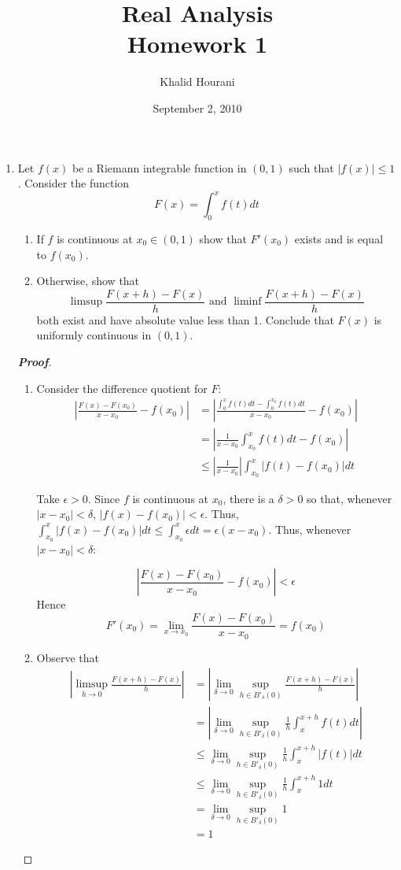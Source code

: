 \documentclass[12pt,leqno]{book}
\title{Real Analysis\\\large Homework 1}
\date{September 2, 2010}
\author{Khalid Hourani}
\theoremstyle{definition}
\newenvironment{Proof}{\begin{proof}[\textnormal{\textbf{Proof}}]}{\end{proof}}
\begin{document}
\begin{titlepage}
 \maketitle
\end{titlepage}

\begin{enumerate}
 \item Let $f(x)$ be a Riemann integrable function in $(0,1)$ such that $|f(x)|\leq1$. Consider the function \[F(x)=\int_0^xf(t)dt\]  \begin{enumerate}                                                                                                                                           \item If $f$ is continuous at $x_0\in(0,1)$ show that $F'(x_0)$ exists and is equal to $f(x_0)$.
 \item Otherwise, show that \[\limsup{\frac{F(x+h)-F(x)}{h}}\text{ and }\liminf{\frac{F(x+h)-F(x)}{h}}\] both exist and have absolute value less than 1. Conclude that $F(x)$ is uniformly continuous in $(0,1)$.
\end{enumerate}
\begin{Proof}
 \begin{enumerate}
  \item Consider the difference quotient for $F$: \begin{align*}\left|\frac{F(x)-F(x_0)}{x-x_0}-f(x_0)\right|&=\left|\frac{\int_0^{x}f(t)dt-\int_0^{x_0}f(t)dt}{x-x_0}-f(x_0)\right|\\&=\left|\frac{1}{x-x_0}\int_{x_0}^{x}f(t)dt-f(x_0)\right|\\&\leq\left|\frac{1}{x-x_0}\right|\int_{x_0}^{x}|f(t)-f(x_0)|dt\end{align*}

  Take $\epsilon>0$. Since $f$ is continuous at $x_0$, there is a $\delta>0$ so that, whenever $|x-x_0|<\delta$, $|f(x)-f(x_0)|<\epsilon$. Thus, $\int_{x_0}^x|f(x)-f(x_0)|dt\leq\int_{x_0}^x\epsilon dt=\epsilon(x-x_0)$. Thus, whenever $|x-x_0|<\delta$:

\[\left|\frac{F(x)-F(x_0)}{x-x_0}-f(x_0)\right|<\epsilon\] Hence \[F'(x_0)=\lim_{x\to x_0}\frac{F(x)-F(x_0)}{x-x_0}=f(x_0)\]
  \item Observe that \begin{align*}\left|\limsup_{h\to0}\frac{F(x+h)-F(x)}{h}\right|&=\left|\lim_{\delta\to0}\sup_{h\in B'_{\delta}(0)}\frac{F(x+h)-F(x)}{h}\right|\\&=\left|\lim_{\delta\to0}\sup_{h\in B'_{\delta}(0)}\frac{1}{h}\int_x^{x+h}f(t)dt\right|\\&\leq\lim_{\delta\to0}\sup_{h\in B'_{\delta}(0)}\frac{1}{h}\int_x^{x+h}|f(t)|dt\\&\leq\lim_{\delta\to0}\sup_{h\in B'_{\delta}(0)}\frac{1}{h}\int_x^{x+h}1dt\\&=\lim_{\delta\to0}\sup_{h\in B'_{\delta}(0)}1\\&=1\end{align*}


\end{enumerate}
\end{Proof}
\end{enumerate}
\end{document}
